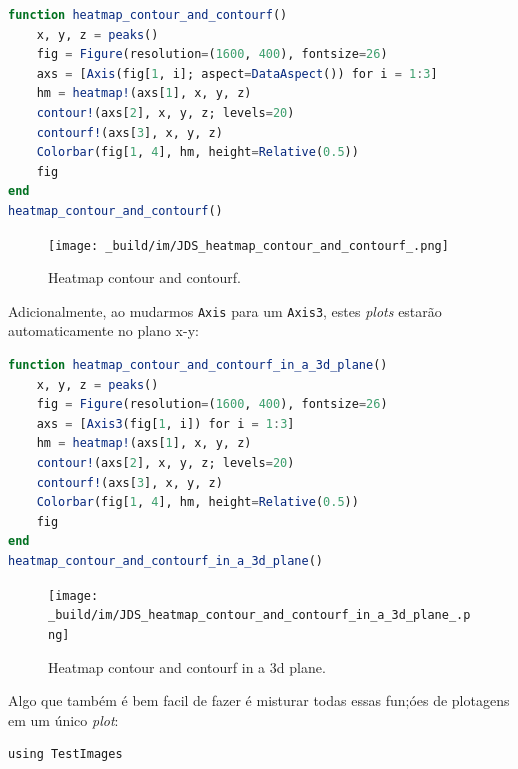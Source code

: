 \documentclass[
  notoc %
]{tufte-book}
\newcommand{\passthrough}[1]{#1}
\begin{document}
\begin{lstlisting}[language=Julia]
function heatmap_contour_and_contourf()
    x, y, z = peaks()
    fig = Figure(resolution=(1600, 400), fontsize=26)
    axs = [Axis(fig[1, i]; aspect=DataAspect()) for i = 1:3]
    hm = heatmap!(axs[1], x, y, z)
    contour!(axs[2], x, y, z; levels=20)
    contourf!(axs[3], x, y, z)
    Colorbar(fig[1, 4], hm, height=Relative(0.5))
    fig
end
heatmap_contour_and_contourf()
\end{lstlisting}

\begin{figure}
\hypertarget{fig:heatmap_contour_and_contourf}{%
\centering
\texttt{[image: \_build/im/JDS\_heatmap\_contour\_and\_contourf\_.png]}
\caption{Heatmap contour and
contourf.}\label{fig:heatmap_contour_and_contourf}
}
\end{figure}

Adicionalmente, ao mudarmos \passthrough{\lstinline!Axis!} para um
\passthrough{\lstinline!Axis3!}, estes \emph{plots} estarão
automaticamente no plano x-y:

\begin{lstlisting}[language=Julia]
function heatmap_contour_and_contourf_in_a_3d_plane()
    x, y, z = peaks()
    fig = Figure(resolution=(1600, 400), fontsize=26)
    axs = [Axis3(fig[1, i]) for i = 1:3]
    hm = heatmap!(axs[1], x, y, z)
    contour!(axs[2], x, y, z; levels=20)
    contourf!(axs[3], x, y, z)
    Colorbar(fig[1, 4], hm, height=Relative(0.5))
    fig
end
heatmap_contour_and_contourf_in_a_3d_plane()
\end{lstlisting}

\begin{figure}
\hypertarget{fig:heatmap_contour_and_contourf_in_a_3d_plane}{%
\centering
\texttt{[image: \_build/im/JDS\_heatmap\_contour\_and\_contourf\_in\_a\_3d\_plane\_.png]}
\caption{Heatmap contour and contourf in a 3d
plane.}\label{fig:heatmap_contour_and_contourf_in_a_3d_plane}
}
\end{figure}

Algo que também é bem facil de fazer é misturar todas essas fun;óes de
plotagens em um único \emph{plot}:

\begin{lstlisting}
using TestImages
\end{lstlisting}
\end{document}
